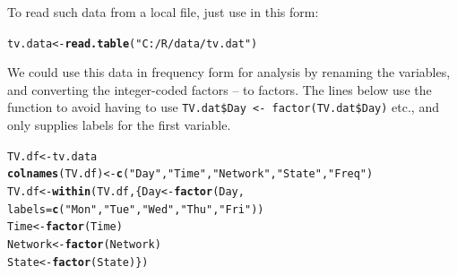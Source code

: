 \documentclass[11pt]{book}\usepackage[]{graphicx}\usepackage[]{color}
\makeatletter
\newcommand{\hlstr}[1]{\textcolor[rgb]{0.192,0.494,0.8}{#1}}%
\newcommand{\hlstd}[1]{\textcolor[rgb]{0.345,0.345,0.345}{#1}}%
\newcommand{\hlkwb}[1]{\textcolor[rgb]{0.69,0.353,0.396}{#1}}%
\newcommand{\hlkwc}[1]{\textcolor[rgb]{0.333,0.667,0.333}{#1}}%
\newcommand{\hlkwd}[1]{\textcolor[rgb]{0.737,0.353,0.396}{\textbf{#1}}}%
\newenvironment{kframe}{%
 \def\at@end@of@kframe{}%
 \ifinner\ifhmode%
  \def\at@end@of@kframe{\end{minipage}}%
  \begin{minipage}{\columnwidth}%
 \fi\fi%
 \def\FrameCommand##1{\hskip\@totalleftmargin \hskip-\fboxsep
 \colorbox{shadecolor}{##1}\hskip-\fboxsep
     \hskip-\linewidth \hskip-\@totalleftmargin \hskip\columnwidth}%
 \MakeFramed {\advance\hsize-\width
   \@totalleftmargin\z@ \linewidth\hsize
   \@setminipage}}%
 {\par\unskip\endMakeFramed%
 \at@end@of@kframe}
\newenvironment{knitrout}{}{} %
\renewenvironment{knitrout}{\small\renewcommand{\baselinestretch}{.85}}{} %
\makeatother
\begin{document}
To read such data from a local file, just use  in this form:
\begin{knitrout}
\color{fgcolor}\begin{kframe}
\begin{alltt}
\hlstd{tv.data}\hlkwb{<-}\hlkwd{read.table}\hlstd{(}\hlstr{"C:/R/data/tv.dat"}\hlstd{)}
\end{alltt}
\end{kframe}
\end{knitrout}


We could use this data in frequency form for analysis by renaming the variables,
and converting the integer-coded factors  --  to \R factors.
The lines below use the function  to avoid having to use
\verb|TV.dat$Day <- factor(TV.dat$Day)| etc., and only supplies labels for the
first variable.
\begin{knitrout}\footnotesize
{}\color{fgcolor}\begin{kframe}
\begin{alltt}
\hlstd{TV.df} \hlkwb{<-} \hlstd{tv.data}
\hlkwd{colnames}\hlstd{(TV.df)} \hlkwb{<-} \hlkwd{c}\hlstd{(}\hlstr{"Day"}\hlstd{,} \hlstr{"Time"}\hlstd{,} \hlstr{"Network"}\hlstd{,} \hlstr{"State"}\hlstd{,} \hlstr{"Freq"}\hlstd{)}
\hlstd{TV.df} \hlkwb{<-} \hlkwd{within}\hlstd{(TV.df, \{Day} \hlkwb{<-} \hlkwd{factor}\hlstd{(Day,}
                                      \hlkwc{labels}\hlstd{=}\hlkwd{c}\hlstd{(}\hlstr{"Mon"}\hlstd{,} \hlstr{"Tue"}\hlstd{,} \hlstr{"Wed"}\hlstd{,} \hlstr{"Thu"}\hlstd{,} \hlstr{"Fri"}\hlstd{))}
                        \hlstd{Time} \hlkwb{<-} \hlkwd{factor}\hlstd{(Time)}
                        \hlstd{Network} \hlkwb{<-} \hlkwd{factor}\hlstd{(Network)}
                        \hlstd{State} \hlkwb{<-} \hlkwd{factor}\hlstd{(State)\})}
\end{alltt}
\end{kframe}
\end{knitrout}
\end{document}
